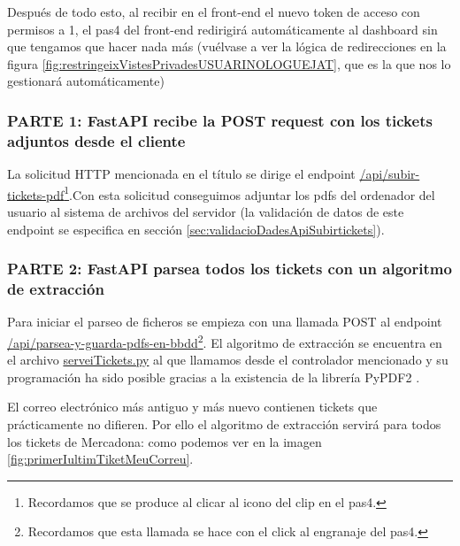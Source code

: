 \documentclass[a4paper,12pt]{report}
\begin{document}
	
	Después de todo esto, al recibir en el front-end el nuevo token de acceso con permisos a 1, el pas4 del front-end redirigirá automáticamente al dashboard sin que tengamos que hacer nada más (vuélvase a ver la lógica de redirecciones en la figura \ref{fig:restringeixVistesPrivadesUSUARINOLOGUEJAT}, que es la que nos lo gestionará automáticamente)
	
		
		
		
		
		\subsubsection{PARTE 1:  FastAPI recibe la POST \textbf{request} con los tickets adjuntos desde el cliente}
		\label{sec:PARTE1_FASTAPI}
		
		La solicitud HTTP mencionada en el título se dirige el endpoint \href{https://github.com/blackcub3s/mercApp/blob/1394c4a58c59d41e1b64f1113007277676fe4cf8/APP%20WEB/__FastAPI__/app/controlador.py#L111-L128}{/api/subir-tickets-pdf}\footnote{Recordamos que se produce al clicar al icono del clip en el pas4.}.Con esta solicitud conseguimos adjuntar los pdfs del ordenador del usuario al sistema de archivos del servidor (la validación de datos de este endpoint se especifica en sección \ref{sec:validacioDadesApiSubirtickets}).
		
		\subsubsection{PARTE 2: FastAPI parsea todos los tickets con un algoritmo de extracción}
		\label{sec:PARTE2_FASTAPI}
		
		Para iniciar el parseo de ficheros se empieza con una llamada POST al endpoint \href{https://github.com/blackcub3s/mercApp/blob/f5413ed8cf7ed88c5ed18299564b836d27c52bd4/APP%20WEB/__FastAPI__/app/controlador.py#L132-L152}{/api/parsea-y-guarda-pdfs-en-bbdd}\footnote{Recordamos que esta llamada se hace con el click al engranaje del pas4.}. El algoritmo de extracción se encuentra en el archivo \href{https://github.com/blackcub3s/mercApp/blob/main/APP%20WEB/__FastAPI__/app/serveiTickets.py}{serveiTickets.py} al que llamamos desde el controlador mencionado y su programación ha sido posible gracias a la existencia de la librería PyPDF2 \cite{PyPDF2}.
		
		El correo electrónico más antiguo y más nuevo contienen tickets que prácticamente no difieren. Por ello el algoritmo de extracción servirá para todos los tickets de Mercadona: como podemos ver en la imagen \ref{fig:primerIultimTiketMeuCorreu}.
		
\end{document}
